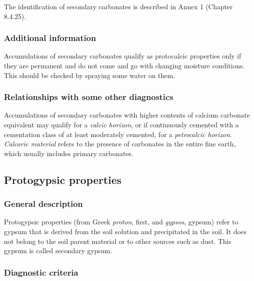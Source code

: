 \documentclass[
  letterpaper,
  DIV=11,
  numbers=noendperiod]{scrreprt}
\begin{document}
The identification of secondary carbonates is described in Annex 1
(Chapter 8.4.25).

\hypertarget{additional-information-27}{%
\subsubsection{Additional information}\label{additional-information-27}}

Accumulations of secondary carbonates qualify as protocalcic properties
only if they are permanent and do not come and go with changing moisture
conditions. This should be checked by spraying some water on them.

\hypertarget{relationships-with-some-other-diagnostics-43}{%
\subsubsection{Relationships with some other
diagnostics}\label{relationships-with-some-other-diagnostics-43}}

Accumulations of secondary carbonates with higher contents of calcium
carbonate equivalent may qualify for a \emph{calcic horizon}, or if
continuously cemented with a cementation class of at least moderately
cemented, for a \emph{petrocalcic horizon}. \emph{Calcaric material}
refers to the presence of carbonates in the entire fine earth, which
usually includes primary carbonates.

\hypertarget{protogypsic-properties}{%
\subsection{Protogypsic properties}\label{protogypsic-properties}}

\hypertarget{general-description-47}{%
\subsubsection{General description}\label{general-description-47}}

Protogypsic properties (from Greek \emph{proton}, first, and
\emph{gypsos}, gypsum) refer to gypsum that is derived from the soil
solution and precipitated in the soil. It does not belong to the soil
parent material or to other sources such as dust. This gypsum is called
secondary gypsum.

\hypertarget{diagnostic-criteria-48}{%
\subsubsection{Diagnostic criteria}\label{diagnostic-criteria-48}}
\end{document}
